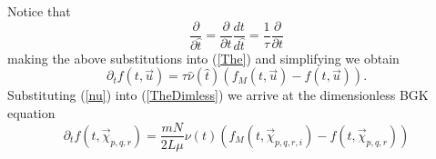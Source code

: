 %
%
Notice that
%
\begin{equation}
\frac{\partial}{\partial \hat{t}} = \frac{\partial}{\partial t} \frac{d t}{d \hat{t}} = \frac{1}{\tau} \frac{\partial}{\partial t}
\end{equation}
%
making the above substitutions into (\ref{The}) and simplifying we obtain
%
%
%
\begin{equation}
\label{TheDimless}
\partial_{t} f(t, \vec{u}) = \tau \hat{\nu}(\hat{t})\left(f_M(t, \vec{u})- f(t,\vec{u})\right).
\end{equation}
%
%
%
%
%
%
%
Substituting (\ref{nu}) into (\ref{TheDimless}) we arrive at the dimensionless BGK equation
%
\begin{equation}
\label{DiscreteEQ}
\partial_{t} f(t,\vec{\chi}_{p,q,r}) = \frac{m N}{2 L \mu} \nu(t) (f_M(t,\vec{\chi}_{p,q,r,i})-f(t,\vec{\chi}_{p,q,r}))
\end{equation}
